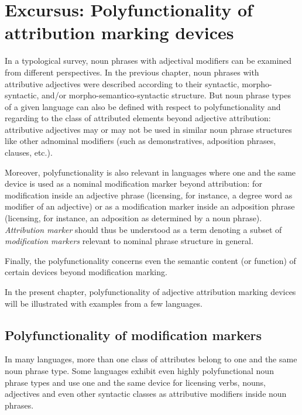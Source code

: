 
\chapter[Polyfunctionality]{Excursus: Polyfunctionality of attribution marking devices}
\label{polyfunctionality}
In a typological survey, noun phrases with adjectival modifiers can be examined from different perspectives. In the previous chapter, noun phrases with attributive adjectives were described according to their syntactic, morpho-syntactic, and/or morpho-semantico-syntactic structure. But noun phrase types of a given language can also be defined with respect to polyfunctionality and regarding to the class of attributed elements beyond adjective attribution: attributive adjectives may or may not be used in similar noun phrase structures like other adnominal modifiers (such as demonstratives, adposition phrases, clauses, etc.).

Moreover, polyfunctionality is also relevant in languages where one and the same device is used as a nominal modification marker beyond attribution: for modification inside an adjective phrase (licensing, for instance, a degree word as modifier of an adjective) or as a modification marker inside an adposition phrase (licensing, for instance, an adposition as determined by a noun phrase). \textit{Attribution marker} should thus be understood as a term denoting a subset of \textit{modification markers} relevant to nominal phrase structure in general.

Finally, the polyfunctionality concerns even the semantic content (or function) of certain devices beyond modification marking. 

In the present chapter, polyfunctionality of adjective attribution marking devices will be illustrated with examples from a few languages.

\section{Polyfunctionality of modification markers}
In many languages, more than one class of attributes belong to one and the same noun phrase type. Some languages exhibit even highly polyfunctional noun phrase types and use one and the same device for licensing verbs, nouns, adjectives and even other syntactic classes as attributive modifiers inside noun phrases.

